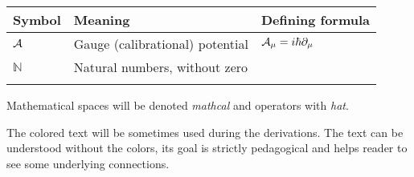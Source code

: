 

\begin{tabular} {@{}C{1.9cm}@{}p{8cm}@{}C{3.77cm}}
	\toprule
	\textbf{Symbol}& \textbf{Meaning}& \textbf{Defining formula}\\\bottomrule
	$\mathcal{A}$ & Gauge (calibrational) potential & $\mathcal{A}_\mu=i\hbar \partial_\mu$ \\
	$\mathbb{N}$ & Natural numbers, without zero \\
\bottomrule
{}
\end{tabular}

Mathematical spaces will be denoted \emph{mathcal} and operators with \emph{hat}.

The colored text will be sometimes used during the derivations. The text can be understood without the colors, its goal is strictly pedagogical and helps reader to see some underlying connections.